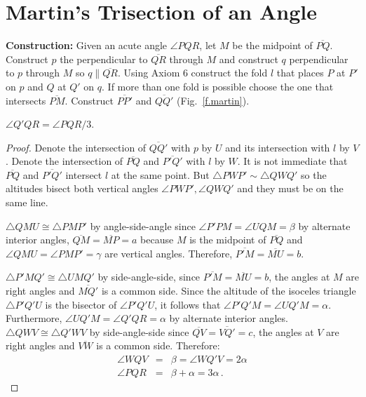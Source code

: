 \newpage

\section{Martin's Trisection of an Angle}\label{s.martin-trisection}

\noindent\textbf{Construction:}
Given an acute angle $\angle PQR$, let $M$ be the midpoint of $\overline{PQ}$. Construct $p$ the perpendicular to $\overline{QR}$ through $M$ and construct $q$ perpendicular to $p$ through $M$ so $q\parallel\overline{QR}$. Using Axiom 6 construct the fold $l$ that places $P$ at $P'$ on $p$ and $Q$ at $Q'$ on $q$. If more than one fold is possible choose the one that intersects $\overline{PM}$. Construct $\overline{PP'}$ and $\overline{QQ'}$  (Fig.~\ref{f.martin}).

\begin{theorem}
$\angle Q'QR=\angle PQR/3$.
\end{theorem}
\begin{proof}
Denote the intersection of $\overline{QQ'}$ with $p$ by $U$ and its intersection with $l$ by $V$. Denote the intersection of $\overline{PQ}$ and $\overline{P'Q'}$ with $l$ by $W$. It is not immediate that $\overline{PQ}$ and $\overline{P'Q'}$ intersect $l$ at the same point. But $\triangle PWP' \sim \triangle QWQ'$ so the altitudes bisect both vertical angles $\angle PWP', \angle QWQ'$ and they must be on the same line.

$\triangle QMU\cong \triangle PMP'$ by angle-side-angle since  $\angle P'PM=\angle UQM=\beta$ by alternate interior angles, $\overline{QM}=\overline{MP}=a$ because $M$ is the midpoint of $\overline{PQ}$ and $\angle QMU=\angle PMP'=\gamma$ are vertical angles. Therefore, $\overline{P'M}=\overline{MU}=b$.

\newpage

$\triangle P'MQ'\cong \triangle UMQ'$ by side-angle-side, since $\overline{P'M}=\overline{MU}=b$, the angles at $M$ are right angles and $\overline{MQ'}$ is a common side. Since the altitude of the isoceles triangle $\triangle P'Q'U$ is the bisector of $\angle P'Q'U$, it follows that $\angle P'Q'M=\angle UQ'M=\alpha$. Furthermore, $\angle UQ'M=\angle Q'QR=\alpha$ by alternate interior angles. $\triangle QWV\cong\triangle Q'WV$ by side-angle-side since $\overline{QV}=\overline{VQ'}=c$, the angles at $V$ are right angles and $\overline{VW}$ is a common side. Therefore:
\begin{eqnarray*}
\angle WQV&=&\beta=\angle WQ'V=2\alpha\\
\angle PQR &=& \beta + \alpha = 3\alpha\,.
\end{eqnarray*}
\end{proof}

